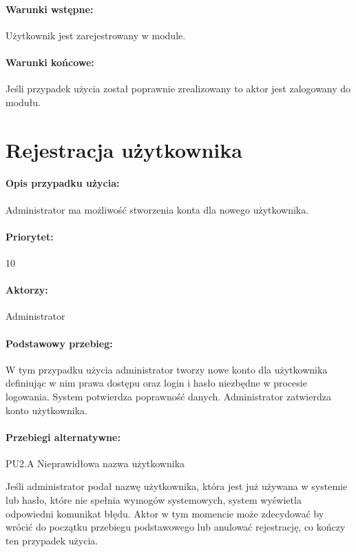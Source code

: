 \documentclass[11pt, a4paper, oneside]{report}
\begin{document}
\paragraph{Warunki wstępne:} Użytkownik jest zarejestrowany w module.
\paragraph{Warunki końcowe:} Jeśli przypadek użycia został poprawnie zrealizowany to aktor jest zalogowany do modułu.

\section{Rejestracja użytkownika}
\paragraph{Opis przypadku użycia:} Administrator ma możliwość stworzenia konta dla nowego użytkownika.
\paragraph{Priorytet:} 10
\paragraph{Aktorzy:} Administrator
\paragraph{Podstawowy przebieg:}
W tym przypadku użycia administrator tworzy nowe konto dla użytkownika definiując w nim prawa dostępu oraz login i hasło niezbędne w procesie logowania.
System potwierdza poprawność danych.
Administrator zatwierdza konto użytkownika.

\paragraph{Przebiegi alternatywne:}

PU2.A Nieprawidłowa nazwa użytkownika

Jeśli administrator podał nazwę użytkownika, która jest już używana w systemie lub hasło, które nie spełnia wymogów systemowych, system wyświetla odpowiedni komunikat błędu. Aktor w tym momencie może zdecydować by wrócić do początku przebiegu podstawowego lub anulować rejestrację, co kończy ten przypadek użycia.
\end{document}

